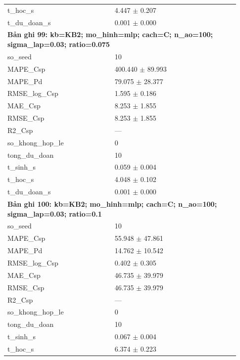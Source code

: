 \begin{longtable}{p{0.43\linewidth}p{0.50\linewidth}}
t\_\allowbreak hoc\_\allowbreak s & 4.447 $\pm$ 0.207 \\
t\_\allowbreak du\_\allowbreak doan\_\allowbreak s & 0.001 $\pm$ 0.000 \\
\midrule
\multicolumn{2}{p{0.95\linewidth}}{\textbf{Bản ghi 99: kb=KB2; mo\_hinh=mlp; cach=C; n\_ao=100; sigma\_lap=0.03; ratio=0.075}} \\
so\_\allowbreak seed & 10 \\
MAPE\_\allowbreak Csp & 400.440 $\pm$ 89.993 \\
MAPE\_\allowbreak Pd & 79.075 $\pm$ 28.377 \\
RMSE\_\allowbreak log\_\allowbreak Csp & 1.595 $\pm$ 0.186 \\
MAE\_\allowbreak Csp & 8.253 $\pm$ 1.855 \\
RMSE\_\allowbreak Csp & 8.253 $\pm$ 1.855 \\
R2\_\allowbreak Csp & — \\
so\_\allowbreak khong\_\allowbreak hop\_\allowbreak le & 0 \\
tong\_\allowbreak du\_\allowbreak doan & 10 \\
t\_\allowbreak sinh\_\allowbreak s & 0.059 $\pm$ 0.004 \\
t\_\allowbreak hoc\_\allowbreak s & 4.048 $\pm$ 0.102 \\
t\_\allowbreak du\_\allowbreak doan\_\allowbreak s & 0.001 $\pm$ 0.000 \\
\midrule
\multicolumn{2}{p{0.95\linewidth}}{\textbf{Bản ghi 100: kb=KB2; mo\_hinh=mlp; cach=C; n\_ao=100; sigma\_lap=0.03; ratio=0.1}} \\
so\_\allowbreak seed & 10 \\
MAPE\_\allowbreak Csp & 55.948 $\pm$ 47.861 \\
MAPE\_\allowbreak Pd & 14.762 $\pm$ 10.542 \\
RMSE\_\allowbreak log\_\allowbreak Csp & 0.402 $\pm$ 0.305 \\
MAE\_\allowbreak Csp & 46.735 $\pm$ 39.979 \\
RMSE\_\allowbreak Csp & 46.735 $\pm$ 39.979 \\
R2\_\allowbreak Csp & — \\
so\_\allowbreak khong\_\allowbreak hop\_\allowbreak le & 0 \\
tong\_\allowbreak du\_\allowbreak doan & 10 \\
t\_\allowbreak sinh\_\allowbreak s & 0.067 $\pm$ 0.004 \\
t\_\allowbreak hoc\_\allowbreak s & 6.374 $\pm$ 0.223 \\

\end{longtable}

